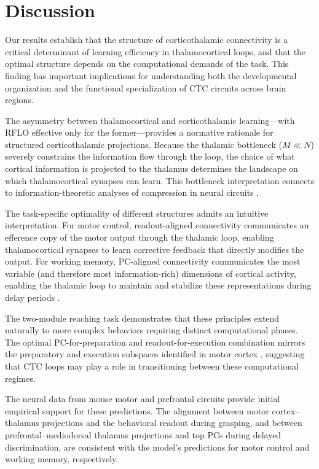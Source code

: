 \documentclass[11pt]{article}
\begin{document}
\section{Discussion}

Our results establish that the structure of corticothalamic connectivity is a critical determinant of learning efficiency in thalamocortical loops, and that the optimal structure depends on the computational demands of the task. This finding has important implications for understanding both the developmental organization and the functional specialization of CTC circuits across brain regions.

The asymmetry between thalamocortical and corticothalamic learning---with RFLO effective only for the former---provides a normative rationale for structured corticothalamic projections. Because the thalamic bottleneck ($M \ll N$) severely constrains the information flow through the loop, the choice of what cortical information is projected to the thalamus determines the landscape on which thalamocortical synapses can learn. This bottleneck interpretation connects to information-theoretic analyses of compression in neural circuits \citep{saxena2019towards}.

The task-specific optimality of different structures admits an intuitive interpretation. For motor control, readout-aligned connectivity communicates an efference copy of the motor output through the thalamic loop, enabling thalamocortical synapses to learn corrective feedback that directly modifies the output. For working memory, PC-aligned connectivity communicates the most variable (and therefore most information-rich) dimensions of cortical activity, enabling the thalamic loop to maintain and stabilize these representations during delay periods \citep{guo2017maintenance}.

The two-module reaching task demonstrates that these principles extend naturally to more complex behaviors requiring distinct computational phases. The optimal PC-for-preparation and readout-for-execution combination mirrors the preparatory and execution subspaces identified in motor cortex \citep{churchland2012neural, shenoy2013cortical}, suggesting that CTC loops may play a role in transitioning between these computational regimes.

The neural data from mouse motor and prefrontal circuits provide initial empirical support for these predictions. The alignment between motor cortex--thalamus projections and the behavioral readout during grasping, and between prefrontal--mediodorsal thalamus projections and top PCs during delayed discrimination, are consistent with the model's predictions for motor control and working memory, respectively.
\end{document}
